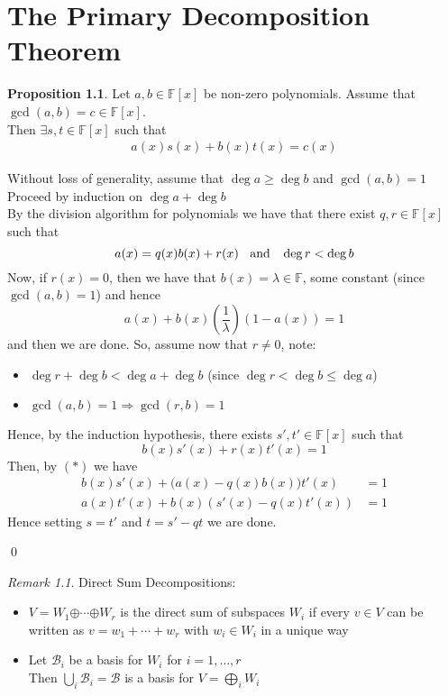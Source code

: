 \documentclass[11pt, a4paper]{report}
\makeatletter
\numberwithin{equation}{section}
\newcommand{\opl}{\boldsymbol{\oplus}}
\newcommand{\F}{\mathbb{F}}
\numberwithin{equation}{subsection}
\theoremstyle{plain}
\theoremstyle{definition}
\newtheorem{prop}[thm]{Proposition}
\theoremstyle{remark}
\newtheorem*{rem}{Remark}
\newtheorem*{prf}{Proof}
\renewenvironment{prf}[1][\proofname]{\par
  \vspace{-\topsep}%
  \normalfont
  \topsep0pt \partopsep0pt %
  \trivlist
  \item[\hskip\labelsep
        \itshape
    #1\@addpunct{.}]\ignorespaces
}{%
  \popQED\endtrivlist\@endpefalse
  \addvspace{6pt plus 6pt} %
}
\newcommand{\pr}[1]{\begin{adjustwidth}{1cm}{} \begin{prf} #1 \end{prf} \end{adjustwidth}}
\makeatother
\begin{document}
\chapter{The Primary Decomposition Theorem}

\begin{prop}
Let $a, b \in \F[x]$ be non-zero polynomials. Assume that $\gcd(a,b) = c \in \F[x]$.\\ Then $\exists s,t \in \F[x]$ such that 
\begin{align*} 
a(x)s(x) + b(x)t(x) = c(x) \tag{$*$} 
\end{align*}

\pr{
Without loss of generality, assume that $\deg a \geq \deg b$ and $\gcd(a,b) = 1$\\
Proceed by induction on $\deg a + \deg b$\\
By the division algorithm for polynomials we have that there exist $q,r \in \F[x]$ such that
$$a(x) = q(x)b(x) + r(x) \text{\;\; and \;\;} \deg r < \deg b$$
Now, if $r(x) = 0$, then we have that $b(x) = \lambda \in \F$, some constant (since $\gcd(a,b) = 1$) and hence
$$a(x) + b(x)\left(\frac{1}{\lambda}\right)(1 - a(x)) = 1$$
and then we are done. So, assume now that $r \neq 0$, note:
\begin{itemize}
\item $\deg r + \deg b < \deg a + \deg b$ \hfill(since $\deg r < \deg b \leq \deg a$)
\item $\gcd(a,b) = 1 \Longrightarrow \gcd(r,b) = 1$
\end{itemize}
Hence, by the induction hypothesis, there exists $s', t' \in \F[x]$ such that
$$b(x)s'(x)+ r(x)t'(x) = 1$$
Then, by $(*)$ we have
\begin{align*}
b(x)s'(x) + \big( a(x) - q(x)b(x) \big) t'(x) &= 1\\
a(x)t'(x) + b(x) \left( s'(x) - q(x) t'(x) \right) &= 1
\end{align*}
Hence setting $s = t'$ and $t = s' - qt$ we are done.
}\qed
\end{prop}

\newpage

\begin{rem} Direct Sum Decompositions:
\begin{itemize}
\item $V = W_1 \opl \cdots \opl W_r$ is the direct sum of subspaces $W_i$ if every $v \in V$ can be written as $v = w_1 + \cdots + w_r$ with $w_i \in W_i$ in a unique way

\item Let $\mathcal{B}_i$ be a basis for $W_i$ for $i = 1, \ldots, r$\\ Then $\bigcup_i \mathcal{B}_i = \mathcal{B}$ is a basis for $V = \bigoplus_i W_i$
\end{itemize}
\end{rem}
\end{document}
